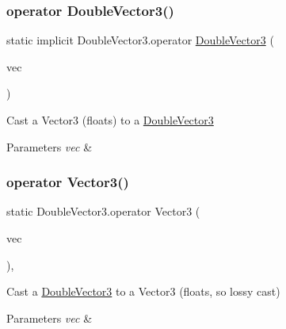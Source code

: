 \subsubsection{\texorpdfstring{operator DoubleVector3()}{operator DoubleVector3()}}
{\footnotesize\ttfamily static implicit Double\+Vector3.\+operator \mbox{\hyperlink{class_double_vector3}{Double\+Vector3}} (\begin{DoxyParamCaption}\item[{Vector3}]{vec }\end{DoxyParamCaption})\hspace{0.3cm}{\ttfamily [static]}}



Cast a Vector3 (floats) to a \mbox{\hyperlink{class_double_vector3}{Double\+Vector3}} 


\begin{DoxyParams}{Parameters}
{\em vec} & \\
\hline
\end{DoxyParams}
\mbox{\label{class_double_vector3_a74319964445fa87e6f626a9034846474}} 
\subsubsection{\texorpdfstring{operator Vector3()}{operator Vector3()}}
{\footnotesize\ttfamily static Double\+Vector3.\+operator Vector3 (\begin{DoxyParamCaption}\item[{\mbox{\hyperlink{class_double_vector3}{Double\+Vector3}}}]{vec }\end{DoxyParamCaption})\hspace{0.3cm}{\ttfamily [explicit]}, {\ttfamily [static]}}



Cast a \mbox{\hyperlink{class_double_vector3}{Double\+Vector3}} to a Vector3 (floats, so lossy cast) 


\begin{DoxyParams}{Parameters}
{\em vec} & \\
\hline
\end{DoxyParams}
\mbox{\label{class_double_vector3_a411c82aaca8d68a748acbc659d263edb}} 
